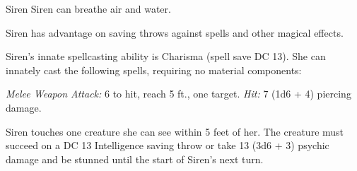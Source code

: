 \documentclass[10pt,a4paper,twoside,bg=print,twocolumn,openany,nodeprecatedcode]{dndbook}
\begin{document}
\begin{DndMonster}[float=t]{Siren}
\DndMonsterBasics[
armor-class = {14},
hit-points = {\DndDice{7d8 + 7}},
speed = {30 ft., swim 30 ft.}
]
\DndMonsterAbilityScores[
 str = 10,
 dex = 18,
 con = 12,
 int = 13,
 wis = 14,
 cha = 16
]
\DndMonsterDetails[
skills = {Medicine +4, Nature +3, Stealth +6, Survival +4},
senses = {darkvision 60 ft., passive perception 12},
languages = {Common, Elvish, Sylvan},
challenge = 3,
]
Siren can breathe air and water.

Siren has advantage on saving throws against spells and other magical effects.

Siren's innate spellcasting ability is Charisma (spell save DC 13). She can innately cast the following spells, requiring no material components:
\begin{DndMonsterSpells}
\end{DndMonsterSpells}
\textsl{Melee Weapon Attack:} 6 to hit, reach 5 ft., one target. \textsl{Hit:} 7 (1d6 + 4) piercing damage.

Siren touches one creature she can see within 5 feet of her. The creature must succeed on a DC 13 Intelligence saving throw or take 13 (3d6 + 3) psychic damage and be stunned until the start of Siren's next turn.

\end{DndMonster}
\end{document}
